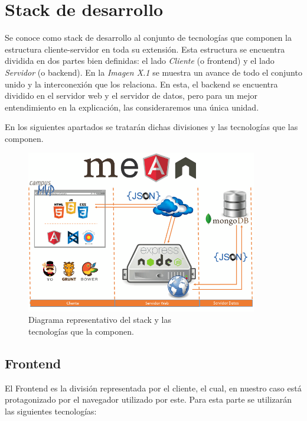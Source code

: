 \documentclass[oneside]{book}
\begin{document}
\section{Stack de desarrollo}

	Se conoce como stack de desarrollo al conjunto de tecnologías que componen la estructura cliente-servidor en toda su extensión. Esta estructura se encuentra dividida en dos partes bien definidas: el lado \textit{Cliente} (o frontend) y el lado \textit{Servidor} (o backend). En la \textit{Imagen X.1} se muestra un avance de todo el conjunto unido y la interconexión que los relaciona. En esta, el backend se encuentra dividido en el servidor web y el servidor de datos, pero para un mejor entendimiento en la explicación, las consideraremos una única unidad.
	\par
	En los siguientes apartados se tratarán dichas divisiones y las tecnologías que las componen.
	\bigskip\bigskip

\begin{figure}[H]
	\centering
	\includegraphics[width=0.9\textwidth]{images/01-stack.png}
	\medskip
	\caption{Diagrama representativo del stack y las \\ tecnologías que la componen.}
	\medskip
\end{figure}
\bigskip


\subsection{Frontend}

	El Frontend es la división representada por el cliente, el cual, en nuestro caso está protagonizado por el navegador utilizado por este. Para esta parte se utilizarán las siguientes tecnologías:
\end{document}
